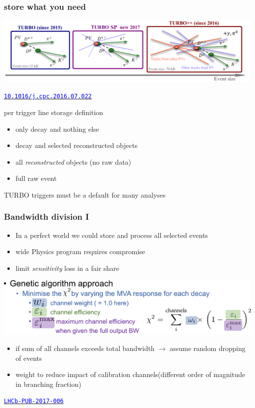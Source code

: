 \documentclass[table,xcolor=dvipsnames,professionalfonts]{beamer}
\newcommand{\myhref}[2]{\href{#1}{\footnotesize{\textcolor{blue}{\texttt{#2}}}}}
\begin{document}
\begin{frame}
  \frametitle{store what you need}
  \includegraphics[width=\textwidth]{./turbosp.png}

  \myhref{http://dx.doi.org/10.1016/j.cpc.2016.07.022}{10.1016/j.cpc.2016.07.022}
  
  \begin{block}{per trigger line storage definition}
  \begin{itemize}
      \item only decay and nothing else
      \item decay and selected reconstructed objects
      \item all \emph{reconstructed} objects (no raw data)
      \item full raw event
  \end{itemize}
  TURBO triggers must be a default for many analyses
  \end{block}
\end{frame}

\begin{frame}
  \frametitle{Bandwidth division I}
  \begin{itemize}
    \item In a perfect world we could store and process all selected events
    \item wide Physics program requires compromise
    \item limit \emph{sensitivity} loss in a fair share
  \end{itemize}

  \begin{block}{}
    \includegraphics[width=\textwidth]{./BW.pdf}
    \begin{itemize}
        \item if sum of all channels exceeds total bandwidth \newline$\rightarrow$ assume random dropping of events
        \item weight to reduce impact of calibration channels\newline (different order of magnitude in branching fraction)
    \end{itemize}
  \end{block}


  \myhref{https://cds.cern.ch/record/2244313}{LHCb-PUB-2017-006}
\end{frame}
\end{document}
